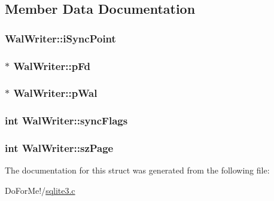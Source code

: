 \subsection{Member Data Documentation}
\hypertarget{struct_wal_writer_a1227aea1e12b6b409e8a7cdbae43588e}{
\subsubsection[{i\-Sync\-Point}]{ Wal\-Writer\-::i\-Sync\-Point}}\label{struct_wal_writer_a1227aea1e12b6b409e8a7cdbae43588e}
\hypertarget{struct_wal_writer_a0c98cddd084b97d9f531fa71b92ef40a}{
\subsubsection[{p\-Fd}]{$\ast$ Wal\-Writer\-::p\-Fd}}\label{struct_wal_writer_a0c98cddd084b97d9f531fa71b92ef40a}
\hypertarget{struct_wal_writer_a3ed1cabab4a2f0572ec04d2a174e5bf9}{
\subsubsection[{p\-Wal}]{$\ast$ Wal\-Writer\-::p\-Wal}}\label{struct_wal_writer_a3ed1cabab4a2f0572ec04d2a174e5bf9}
\hypertarget{struct_wal_writer_acc8dcbdc9b91bae4799b5de113742ae6}{
\subsubsection[{sync\-Flags}]{\setlength{\rightskip}{0pt plus 5cm}int Wal\-Writer\-::sync\-Flags}}\label{struct_wal_writer_acc8dcbdc9b91bae4799b5de113742ae6}
\hypertarget{struct_wal_writer_aa161832c97830aed52410747ebde5e6e}{
\subsubsection[{sz\-Page}]{\setlength{\rightskip}{0pt plus 5cm}int Wal\-Writer\-::sz\-Page}}\label{struct_wal_writer_aa161832c97830aed52410747ebde5e6e}


The documentation for this struct was generated from the following file\-:\begin{DoxyCompactItemize}
\item 
Do\-For\-Me!/\hyperlink{sqlite3_8c}{sqlite3.\-c}\end{DoxyCompactItemize}
